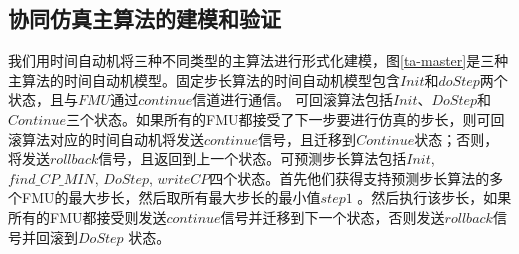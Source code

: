 \subsection{协同仿真主算法的建模和验证} 
我们用时间自动机将三种不同类型的主算法进行形式化建模，图\ref{ta-master}是三种主算法的时间自动机模型。固定步长算法的时间自动机模型包含$Init$和$doStep$两个状态，且与$FMU$通过$continue$信道进行通信。 可回滚算法包括$Init$、$DoStep$和$Continue$三个状态。如果所有的FMU都接受了下一步要进行仿真的步长，则可回滚算法对应的时间自动机将发送$continue$信号，且迁移到$Continue$状态；否则，将发送$rollback$信号，且返回到上一个状态。可预测步长算法包括$Init$, $find \_ CP \_ MIN$, $DoStep$, $writeCP$四个状态。首先他们获得支持预测步长算法的多个FMU的最大步长，然后取所有最大步长的最小值$step1$ 。然后执行该步长，如果所有的FMU都接受则发送$continue$信号并迁移到下一个状态，否则发送$rollback$信号并回滚到$DoStep$ 状态。
\begin{figure}[htbp]
\end{figure}


